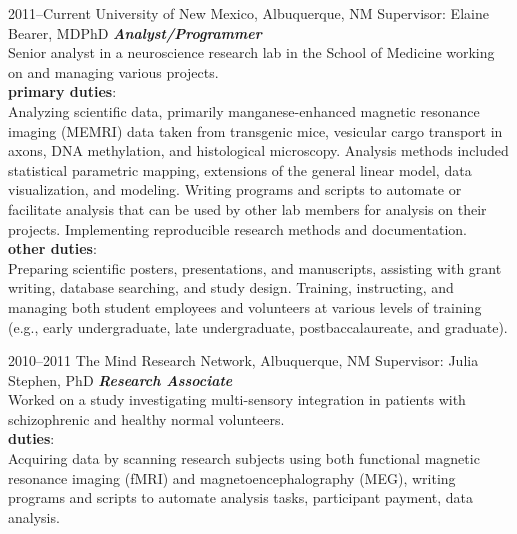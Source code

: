 \documentclass[]{friggeri-cv} %
\begin{document}
\begin{entrylist}
\entry
{2011--Current}
{University of New Mexico, Albuquerque, NM \textemdash Supervisor: Elaine Bearer, MD\textendash PhD}
{}
{\emph{\textbf{Analyst/Programmer}} \\
Senior analyst in a neuroscience research lab in the School of Medicine 
working on and managing various projects. \\
\textbf{primary duties}: \\
Analyzing scientific data, primarily manganese-enhanced magnetic resonance imaging (MEMRI) data 
taken from transgenic mice,
vesicular cargo transport in axons, 
DNA methylation, and histological microscopy. Analysis methods included
statistical parametric mapping, 
extensions of the general linear model, 
data visualization, and modeling.
Writing programs and scripts to automate or facilitate analysis 
that can be used by other lab members for analysis on their projects. 
Implementing reproducible research methods and documentation. \\
\textbf{other duties}: \\
Preparing scientific posters, presentations, and manuscripts, 
assisting with grant writing, database searching, and study design. 
Training, instructing, and managing both student employees and volunteers at various levels of training 
(e.g., early undergraduate, late undergraduate, postbaccalaureate, and graduate). }
\end{entrylist}

\begin{entrylist}
\entry
{2010--2011}
{The Mind Research Network, Albuquerque, NM \textemdash Supervisor: Julia Stephen, PhD}
{}
{\emph{\textbf{Research Associate}} \\
Worked on a study investigating multi-sensory integration in
patients with schizophrenic and healthy normal volunteers. \\
\textbf{duties}:\\
Acquiring data by scanning research subjects using both functional
magnetic resonance imaging (fMRI) and magnetoencephalography (MEG), writing
programs and scripts to automate analysis tasks, 
participant payment, data analysis.}
\end{entrylist}
\end{document}
